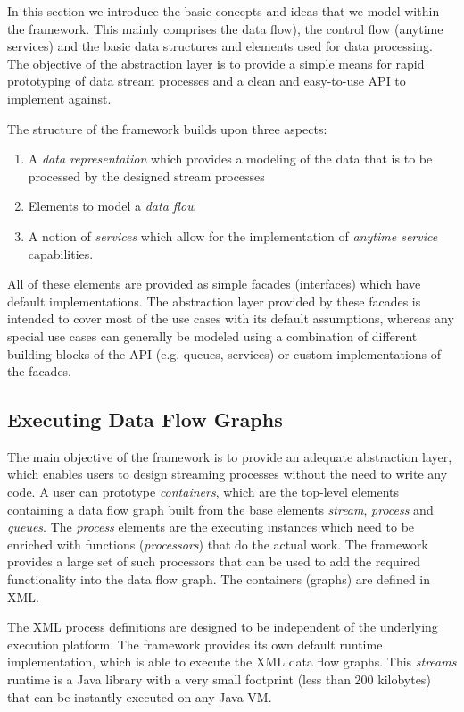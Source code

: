 In this section we introduce the basic concepts and ideas that we
model within the \streams framework. This mainly comprises the data
flow), the control flow (anytime services) and the basic data
structures and elements used for data processing. The objective of the
abstraction layer is to provide a simple means for rapid prototyping
of data stream processes and a clean and easy-to-use API to implement
against.

The structure of the \streams framework builds upon three aspects:
\begin{enumerate}
\item A {\em data representation} which provides a modeling of the
  data that is to be processed by the designed stream processes
\item Elements to model a {\em data flow}
\item A notion of {\em services} which allow for the implementation
  of {\em anytime service} capabilities.
\end{enumerate}
All of these elements are provided as simple facades (interfaces)
which have default implementations. The abstraction layer provided by
these facades is intended to cover most of the use cases with its
default assumptions, whereas any special use cases can generally be
modeled using a combination of different building blocks of the API
(e.g. queues, services) or custom implementations of the facades.

\subsection*{\label{sec:xmlToRuntime}Executing Data Flow Graphs}
The main objective of the \streams framework is to provide an adequate
abstraction layer, which enables users to design streaming processes
without the need to write any code. A user can prototype {\em
  containers}, which are the top-level elements containing a data flow
graph built from the base elements {\em stream}, {\em process} and
{\em queues}. The {\em process} elements are the executing instances
which need to be enriched with functions ({\em processors}) that do
the actual work. The framework provides a large set of such processors
that can be used to add the required functionality into the data flow
graph. The containers (graphs) are defined in XML.

The XML process definitions are designed to be independent of the
underlying execution platform. The \streams framework provides its own
default runtime implementation, which is able to execute the XML data
flow graphs. This {\em streams} runtime is a Java library with a very
small footprint (less than 200 kilobytes) that can be instantly executed on any
Java VM.

